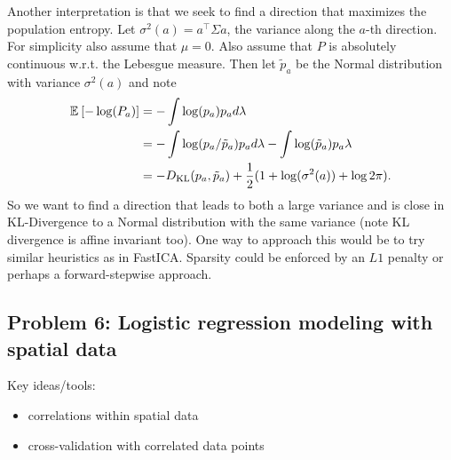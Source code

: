 \begin{enumerate}
Another interpretation is that we seek to find a direction that maximizes the population entropy. Let $\sigma^2(a) =  a^\top \Sigma a$, the variance along the $a$-th direction. For simplicity also assume that $\mu=0$. Also assume that $P$ is absolutely continuous w.r.t. the Lebesgue measure. Then let $\tilde{p}_a$ be the Normal distribution with variance $\sigma^2(a)$ and note
$$
\begin{aligned}
\mathbb{E}_{}\left[-\log(P_a)\right] &= - \int \log(p_a)p_a d\lambda \\
 &=  -\int \log(p_a/\tilde{p}_a)p_a d\lambda -   \int \log(\tilde{p}_a) p_a \lambda \\
 &= - D_{\text{KL}}(p_a, \tilde{p}_a) + \frac{1}{2}(1+\log(\sigma^2(a)) + \log 2\pi).
\end{aligned}
$$
So we want to find a direction that leads to both a large variance and is close in KL-Divergence to a Normal distribution with the same variance (note KL divergence is affine invariant too). One way to approach this would be to try similar heuristics as in FastICA. Sparsity could be enforced by an $L1$ penalty or perhaps a forward-stepwise approach.
\end{enumerate}



\subsection*{Problem 6: Logistic regression modeling with spatial data}
Key ideas/tools:
\begin{itemize}
\item correlations within spatial data
\item cross-validation with correlated data points
\end{itemize}

